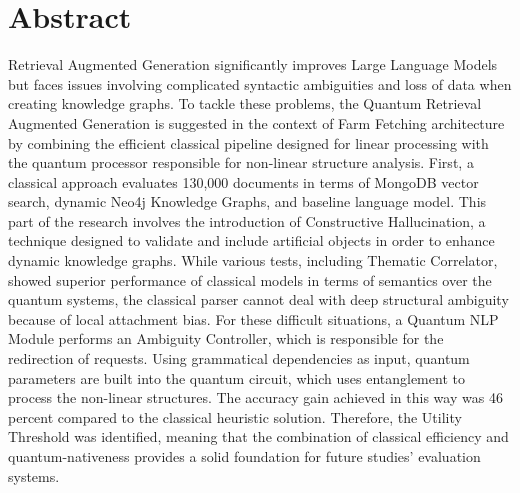 \chapter*{Abstract}
Retrieval Augmented Generation significantly improves Large Language Models but faces issues involving complicated syntactic ambiguities and loss of data when creating knowledge graphs. To tackle these problems, the Quantum Retrieval Augmented Generation is suggested in the context of Farm Fetching architecture by combining the efficient classical pipeline designed for linear processing with the quantum processor responsible for non-linear structure analysis. First, a classical approach evaluates 130,000 documents in terms of MongoDB vector search, dynamic Neo4j Knowledge Graphs, and baseline language model. This part of the research involves the introduction of Constructive Hallucination, a technique designed to validate and include artificial objects in order to enhance dynamic knowledge graphs. While various tests, including Thematic Correlator, showed superior performance of classical models in terms of semantics over the quantum systems, the classical parser cannot deal with deep structural ambiguity because of local attachment bias. For these difficult situations, a Quantum NLP Module performs an Ambiguity Controller, which is responsible for the redirection of requests. Using grammatical dependencies as input, quantum parameters are built into the quantum circuit, which uses entanglement to process the non-linear structures. The accuracy gain achieved in this way was 46 percent compared to the classical heuristic solution. Therefore, the Utility Threshold was identified, meaning that the combination of classical efficiency and quantum-nativeness provides a solid foundation for future studies' evaluation systems.